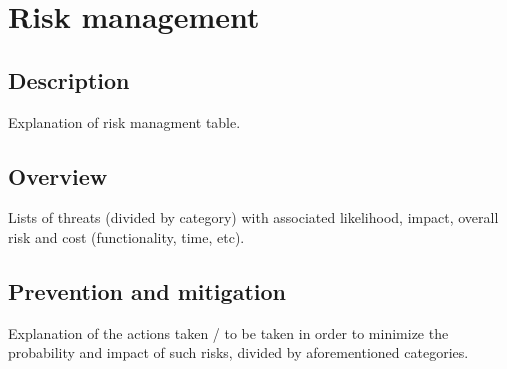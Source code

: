 \section{Risk management}



\subsection{Description}
Explanation of risk managment table.

\subsection{Overview}
Lists of threats (divided by category) with associated likelihood, impact, overall risk and cost (functionality, time, etc).

\subsection{Prevention and mitigation}
Explanation of the actions taken / to be taken in order to minimize the probability and impact of such risks, divided by aforementioned categories.
